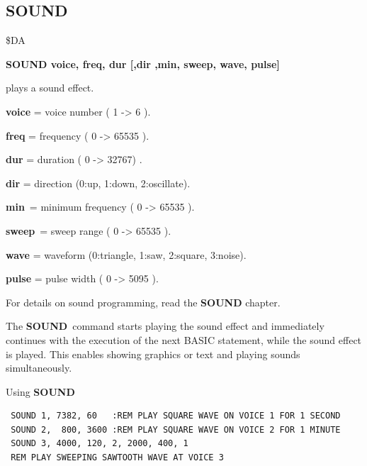 \subsection{SOUND}
\begin{description}[leftmargin=2cm,style=nextline]
\item [Token:] \$DA
\item [Format:] {\bf SOUND voice, freq, dur
                [,dir ,min, sweep, wave, pulse]}

\item [Usage:] plays a sound effect.

               {\bf voice} = voice number ( 1 -> 6 ).

               {\bf freq} = frequency ( 0 -> 65535 ).

               {\bf dur} = duration ( 0 -> 32767) .

               {\bf dir} = direction (0:up, 1:down, 2:oscillate).

               {\bf min} = minimum frequency ( 0 -> 65535 ).

               {\bf sweep} = sweep range ( 0 -> 65535 ).

               {\bf wave} = waveform (0:triangle, 1:saw, 2:square,
               3:noise).

               {\bf pulse} = pulse width ( 0 -> 5095 ).

For details on sound programming, read the {\bf SOUND} chapter.

\item [Remarks:] The {\bf SOUND} command starts playing the sound
               effect and immediately continues with the execution
               of the next BASIC statement, while the sound effect
               is played. This enables showing graphics or text
               and playing sounds simultaneously.

\item [Example:] Using {\bf SOUND}
\begin{tcolorbox}[colback=black,coltext=white]
\verbatimfont{\codefont}
\begin{verbatim}
 SOUND 1, 7382, 60   :REM PLAY SQUARE WAVE ON VOICE 1 FOR 1 SECOND
 SOUND 2,  800, 3600 :REM PLAY SQUARE WAVE ON VOICE 2 FOR 1 MINUTE
 SOUND 3, 4000, 120, 2, 2000, 400, 1
 REM PLAY SWEEPING SAWTOOTH WAVE AT VOICE 3
\end{verbatim}
\end{tcolorbox}
\end{description}

